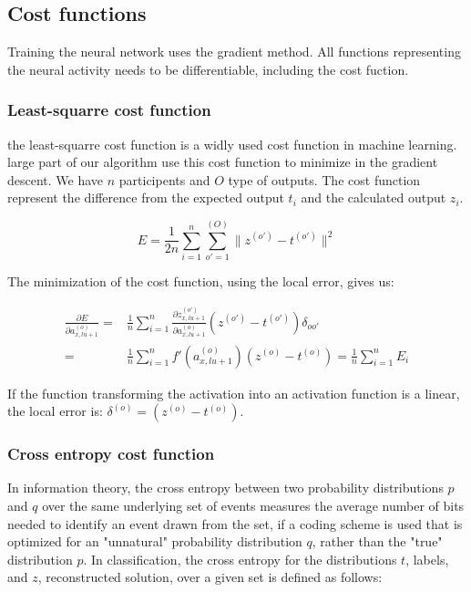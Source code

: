 \documentclass[final, paper=letter,5p,times,twocolumn]{elsarticle}
\begin{document}
\lipsum[2-2]

\subsection{Cost functions}

Training the neural network uses the gradient method. All functions representing the neural activity needs to be differentiable, including the cost fuction. \lipsum[3-3]

\subsubsection{Least-squarre cost function}

the least-squarre cost function is a widly used cost function in machine learning. large part of our algorithm use this cost function to minimize in the gradient descent. We have $n$ participents and $O$ type of outputs. The cost function represent the difference from the expected output $t_{i}$ and the calculated output $z_{i}$.

\begin{equation}
  E = \frac{1}{2n} \sum_{i = 1}^{n} \sum_{o' = 1}^{(O)} \| z^{(o')} - t^{(o')} \|^{2}
  \label{least_squarre}
\end{equation}

The minimization of the cost function, using the local error, gives us:

\begin{equation}
  \begin{split}
    \frac{\partial E}{\partial a_{x,lu+1}^{(o)}} = & \frac{1}{n} \sum_{i = 1}^{n} \frac{\partial z_{x,lu+1}^{(o')}}{\partial a_{x,lu+1}^{(o)}} (z^{(o')} - t^{(o')}) \delta_{oo'} \\
    = & \frac{1}{n} \sum_{i = 1}^{n}  f'(a_{x,lu+1}^{(o)}) (z^{(o)} - t^{(o)}) = \frac{1}{n} \sum_{i = 1}^{n}  E_{i}
  \end{split}
\end{equation}

If the function transforming the activation into an activation function is a linear, the local error is: $\delta^{(o)} = (z^{(o)} - t^{(o)})$.

\subsubsection{Cross entropy cost function}
\label{Cross_entropy_cost_function_sec}

In information theory, the cross entropy between two probability distributions $p$ and $q$ over the same underlying set of events measures the average number of bits needed to identify an event drawn from the set, if a coding scheme is used that is optimized for an "unnatural" probability distribution $q$, rather than the "true" distribution $p$. In classification, the cross entropy for the distributions $t$, labels, and $z$, reconstructed solution, over a given set is defined as follows:
\end{document}
